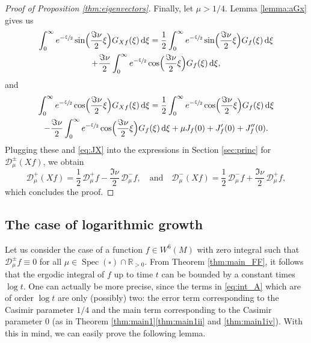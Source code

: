 \documentclass[JEP,XML,SOM,NoEqCountersInSection,Unicode,published]{cedram}
\newcommand \R{\mathbb{R}}
\newcommand*{\diff}{\mathop{}\!\mathrm{d}}
\newcommand{\Dp}[1]{\mathcal{D}_\mu^{+} #1}
\newcommand{\Dm}[1]{\mathcal{D}_\mu^{-} #1}
\newcommand{\Dpm}[1]{\mathcal{D}_\mu^{\pm} #1}
\newcommand{\Dpmp}[1]{\mathcal{D}_\mu^{\pm}(#1)}
\DeclareMathOperator{\Spec}{Spec}
\theoremstyle{definition}
\begin{document}
\begin{proof}[{Proof of Proposition \ref{thm:eigenvectors}}]
Finally, let $\mu > 1/4$. Lemma \ref{lemma:aGx} gives us
\begin{multline*}
\int_0^\infty e^{-\sfrac{\xi}{2}} \sin\Bigl(\frac{\Im\nu}{2}\xi \Bigr) G_{Xf}(\xi) \diff \xi = \frac{1}{2} \int_0^\infty e^{-\sfrac{\xi}{2}} \sin\Bigl(\frac{\Im\nu}{2}\xi \Bigr) G_{f}(\xi) \diff \xi \\
+ \frac{\Im\nu}{2}\int_0^\infty e^{-\sfrac{\xi}{2}} \cos\Bigl(\frac{\Im\nu}{2}\xi \Bigr) G_{f}(\xi) \diff \xi,
\end{multline*}
and
\begin{multline*}
\int_0^\infty e^{-\sfrac{\xi}{2}} \cos\Bigl(\frac{\Im\nu}{2}\xi \Bigr) G_{Xf}(\xi) \diff \xi = \frac{1}{2} \int_0^\infty e^{-\sfrac{\xi}{2}} \cos\Bigl(\frac{\Im\nu}{2}\xi \Bigr) G_{f}(\xi) \diff \xi \\
 - \frac{\Im \nu}{2}\int_0^\infty e^{-\sfrac{\xi}{2}} \cos\Bigl(\frac{\Im\nu}{2}\xi \Bigr) G_{f}(\xi) \diff \xi + \mu J_f(0) + J_f'(0)+ J_f''(0).
\end{multline*}
Plugging these and \eqref{eq:JX} into the expressions in Section \ref{sec:princ} for $\Dpmp{Xf}$, we obtain
\[
\Dp{(Xf)}= \frac{1}{2}\, \Dp{f} - \frac{\Im\nu}{2}\, \Dm{f}, \quad\text{and}\quad \Dm{(Xf)}= \frac{1}{2}\, \Dm{f} + \frac{\Im\nu}{2}\, \Dp{f},
\]
which concludes the proof.
\end{proof}

\subsection{The case of logarithmic growth}\label{sec:log_growth}

Let us consider the case of a function $f \in W^6(M)$ with zero integral such that $\Dpm{f} \equiv 0$ for all $\mu \in \Spec(\square) \cap \R_{>0}$.
From Theorem \ref{thm:main_FF}, it follows that the ergodic integral of $f$ up to time $t$ can be bounded by a constant times $\log t$.
One can actually be more precise, since the terms in \eqref{eq:int_A} which are of order $\log t$ are only (possibly) two: the error term corresponding to the Casimir parameter $1/4$ and the main term corresponding to the Casimir parameter 0 (as in Theorem \ref{thm:main1}\eqref{thm:main1ii} and \eqref{thm:main1iv}). With this in mind, we can easily prove the following lemma.
\end{document}
